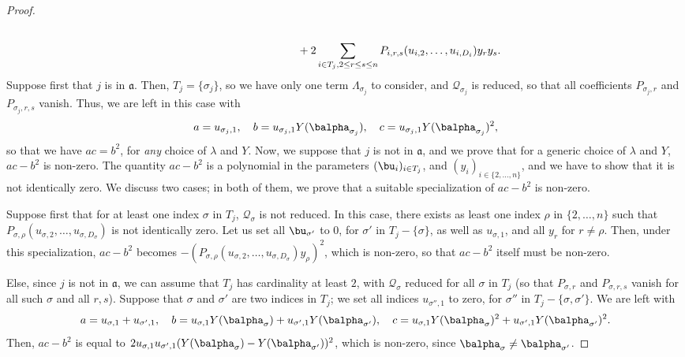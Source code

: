 \documentclass[12pt]{article}
\newcommand{\mf}{Y}
\newcommand{\residueI}{\mathscr{Q}}
\begin{document}
\begin{proof}
\begin{align*}
   \\ & \phantom{{ }= \sum_{i\in T_j}u_{i,1} \mf(\balpha_i)^2}
                                                  +2 \sum_{i \in T_j, 2 \le r \le s \le n} P_{i,r,s}(u_{i,2},\dots,u_{i,D_i})y_ry_s.
  \end{align*}
  Suppose first that $j$ is in $\mathfrak{a}$. Then, $T_j=\{\sigma_j\}$, so we 
  have only one term $\Lambda_{\sigma_j}$ to consider, and $\residueI_{\sigma_j}$ 
  is reduced, so that all coefficients $P_{\sigma_j,r}$ and
  $P_{\sigma_j,r,s}$ vanish. Thus, we are left in
  this case with
  $$
  a = u_{\sigma_j,1}, \quad
  b = u_{\sigma_j,1} \mf(\balpha_{\sigma_j}), \quad
  c = u_{\sigma_j,1} \mf(\balpha_{\sigma_j})^2,
  $$ so that we have $ac=b^2$, for {\em any} choice of $\lambda$ and
  $\mf$. Now, we suppose that $j$ is not in $\mathfrak{a}$, and we prove
  that for a generic choice of $\lambda$ and $\mf$, $ac-b^2$ is non-zero.
  The quantity $ac-b^2$ is a polynomial in the parameters
  $(\bu_i)_{i\in T_j}$, and $(y_i)_{i \in \{2,\dots,n\}}$, and we have
  to show that it is not identically zero. We discuss two cases; in both
  of them, we prove that a suitable specialization of $ac-b^2$ is
  non-zero.
  
  Suppose first that for at least one index $\sigma$ in $T_j$,
  $\residueI_\sigma$ is not reduced. In this case, there exists as least one
  index $\rho$ in $\{2,\dots,n\}$ such that
  $P_{\sigma,\rho}(u_{\sigma,2},\dots,u_{\sigma,D_\sigma})$ is not
  identically zero. Let us set all $\bu_{\sigma'}$
  to $0$, for $\sigma'$ in $T_j-\{\sigma\}$, as well as $u_{\sigma,1}$,
  and all $y_r$ for $r\ne \rho$. Then, under this specialization,
  $ac-b^2$ becomes
  $-(P_{\sigma,\rho}(u_{\sigma,2},\dots,u_{\sigma,D_\sigma})y_\rho)^2$,
  which is non-zero, so that $ac-b^2$ itself must be non-zero.
  
  Else, since $j$ is not in $\mathfrak{a}$, we can assume that $T_j$
  has cardinality at least $2$, with $\residueI_\sigma$ reduced for all $\sigma$
  in $T_j$ (so that $P_{\sigma,r}$ and $P_{\sigma,r,s}$ vanish for 
  all such $\sigma$ and all $r,s$). Suppose that $\sigma$ and $\sigma'$ are two indices in
  $T_j$; we set all indices $u_{\sigma'',1}$ to zero, for $\sigma''$
  in $T_j-\{\sigma,\sigma'\}$. We are left with
  $$
  a=u_{\sigma,1}+u_{\sigma',1},\quad
  b=u_{\sigma,1}\mf(\balpha_{\sigma})+u_{\sigma',1}\mf(\balpha_{\sigma'}),\quad
  c=u_{\sigma,1}\mf(\balpha_{\sigma})^2+u_{\sigma',1}\mf(\balpha_{\sigma'})^2.
  $$
  Then, $ac-b^2$ is equal to $2u_{\sigma,1}u_{\sigma',1}(\mf(\balpha_{\sigma})-\mf(\balpha_{\sigma'}))^2$,
  which is non-zero, since $\balpha_\sigma \ne \balpha_{\sigma'}$.
\end{proof}
\end{document}

